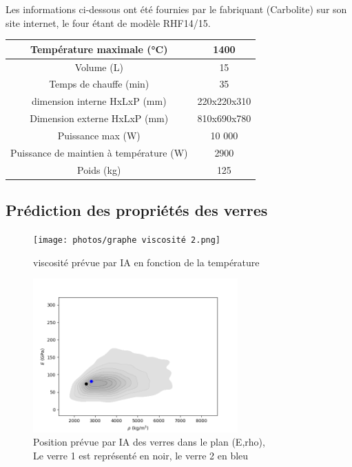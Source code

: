 \documentclass{article}
\begin{document}
Les informations ci-dessous ont été fournies par le fabriquant (Carbolite) sur son site internet, le four étant de modèle RHF14/15.

\begin{table}[ht]
    \centering
\begin{tabular}{|c|c|}
\hline
Température maximale (°C) & 1400  \\
\hline
Volume (L) & 15 \\
\hline
Temps de chauffe (min) & 35 \\
\hline
dimension interne HxLxP (mm) & 220x220x310 \\
\hline
Dimension externe HxLxP (mm) & 810x690x780 \\
\hline
Puissance max (W) & 10 000 \\
\hline
Puissance de maintien à température (W) & 2900 \\
\hline
Poids (kg) & 125 \\
\hline
\end{tabular} 
\end{table}



\subsection{Prédiction des propriétés des verres}
\begin{figure}[ht]
    \centering
    \texttt{[image: photos/graphe viscosité 2.png]}
    \caption{viscosité prévue par IA en fonction de la température}
\end{figure}

\begin{figure}[ht]
    \centering
    \includegraphics[width=0.7\textwidth]{photos/E rho.png}
    \caption{Position prévue par IA des verres dans le plan (E,rho),\\ Le verre 1 est représenté en noir, le verre 2 en bleu}
\end{figure}
\end{document}
